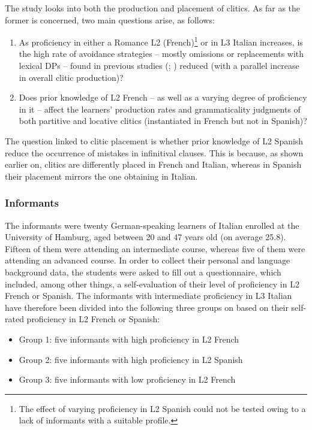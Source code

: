 \documentclass[output=paper,modfonts,nonflat,newtxmath]{langsci/langscibook}
\begin{document}
The study looks into both the production and placement of clitics. As far as the former is concerned, two main questions arise, as follows:

\begin{enumerate}
\item
As proficiency in either a Romance L2 (French)\footnote{ \textrm{The effect of varying proficiency in L2 Spanish could not be tested owing to a lack of informants with a suitable profile.}} or in L3 Italian increases, is the high rate of avoidance strategies – mostly omissions or replacements with lexical DPs – found in previous studies (\citealt[191]{ChiniEtAl2003}; \citealt{LeoniniBelletti2004, Leonini2006, Giannini2008, Maffei2009}) reduced (with a parallel increase in overall clitic production)?

\item
Does prior knowledge of L2 French – as well as a varying degree of proficiency in it – affect the learners’ production rates and grammaticality judgments of both partitive and locative clitics (instantiated in French but not in Spanish)?

\end{enumerate}

The question linked to clitic placement is whether prior knowledge of L2 Spanish reduce the occurrence of mistakes in infinitival clauses. This is because, as shown earlier on, clitics are differently placed in French and Italian, whereas in Spanish their placement mirrors the one obtaining in Italian.

\subsubsection{Informants} %

The informants were twenty German-speaking learners of Italian enrolled at the University of Hamburg, aged between 20 and 47 years old (on average 25.8). Fifteen of them were attending an intermediate course, whereas five of them were attending an advanced course. In order to collect their personal and language background data, the students were asked to fill out a questionnaire, which included, among other things, a self-evaluation of their level of proficiency in L2 French or Spanish. The informants with intermediate proficiency in L3 Italian have therefore been divided into the following three groups on based on their self-rated proficiency in L2 French or Spanish:

\begin{itemize}
\item
Group 1: five informants with high proficiency in L2 French

\item
Group 2: five informants with high proficiency in L2 Spanish

\item
Group 3: five informants with low proficiency in L2 French

\end{itemize}
\end{document}
